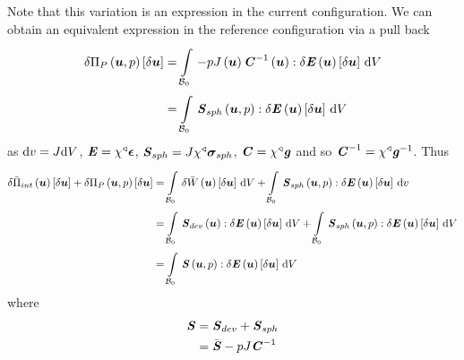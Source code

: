 Note that this variation is an expression in the current configuration. We can
obtain an equivalent expression in the reference configuration via a pull back
\ie
\begin{equation}
  \begin{split}
    \variation{\fnof{\Pi_{P}}{\vectr{u},p}}{\vectr{u}}&=\gint{\embedmanifold{B}_{0}}{}{\doubledotprod{-p\fnof{J}{\vectr{u}}\fnof{\inverse{\tensor{C}}}{\vectr{u}}}{\variation{\fnof{\tensor{E}}{\vectr{u}}}{\vectr{u}}}}{V}\\
    &=\gint{\embedmanifold{B}_{0}}{}{\doubledotprod{\fnof{\tensor{S}_{sph}}{\vectr{u},p}}{\variation{\fnof{\tensor{E}}{\vectr{u}}}{\vectr{u}}}}{V}\\
  \end{split}
\end{equation}
as $  { \mathrm{d} }v  =J  { \mathrm{d} }V  $,
$\boldsymbol{\mathit{E}}= \chi^{\triangleleft}\boldsymbol{\mathit{\epsilon}} $, $\boldsymbol{\mathit{S}}_{sph}=J \chi^{\triangleleft}\boldsymbol{\mathit{\sigma}}_{sph} $,
$\boldsymbol{\mathit{C}}= \chi^{\triangleleft}\boldsymbol{\mathit{g}} $ and so
${\boldsymbol{\mathit{C}}}^{-1}= \chi^{\triangleleft}{\boldsymbol{\mathit{g}}}^{-1} $. Thus
\begin{equation}
  \begin{split}
    \variation{\fnof{\bar{\Pi}_{int}}{\vectr{u}}}{\vectr{u}}+\variation{\fnof{\Pi_{P}}{\vectr{u},p}}{\vectr{u}}&=\gint{\embedmanifold{B}_{0}}{}{\variation{\fnof{\bar{W}}{\vectr{u}}}{\vectr{u}}}{V}+\gint{\embedmanifold{B}_{0}}{}{\doubledotprod{\fnof{\tensor{S}_{sph}}{\vectr{u},p}}{\variation{\fnof{\tensor{E}}{\vectr{u}}}{\vectr{u}}}}{v}\\
    &=\gint{\embedmanifold{B}_{0}}{}{\doubledotprod{\fnof{\tensor{S}_{dev}}{\vectr{u}}}{\variation{\fnof{\tensor{E}}{\vectr{u}}}{\vectr{u}}}}{V}+\gint{\embedmanifold{B}_{0}}{}{\doubledotprod{\fnof{\tensor{S}_{sph}}{\vectr{u},p}}{\variation{\fnof{\tensor{E}}{\vectr{u}}}{\vectr{u}}}}{V}\\
    &=\gint{\embedmanifold{B}_{0}}{}{\doubledotprod{\fnof{\tensor{S}}{\vectr{u},p}}{\variation{\fnof{\tensor{E}}{\vectr{u}}}{\vectr{u}}}}{V}\\
  \end{split}
\end{equation}
where
\begin{equation}
  \begin{split}
    \boldsymbol{\mathit{S}}&=\boldsymbol{\mathit{S}}_{dev}+\boldsymbol{\mathit{S}}_{sph}\\
    &= \bar{\boldsymbol{\mathit{S}}}-pJ{\boldsymbol{\mathit{C}}}^{-1}
  \end{split}
\end{equation}

